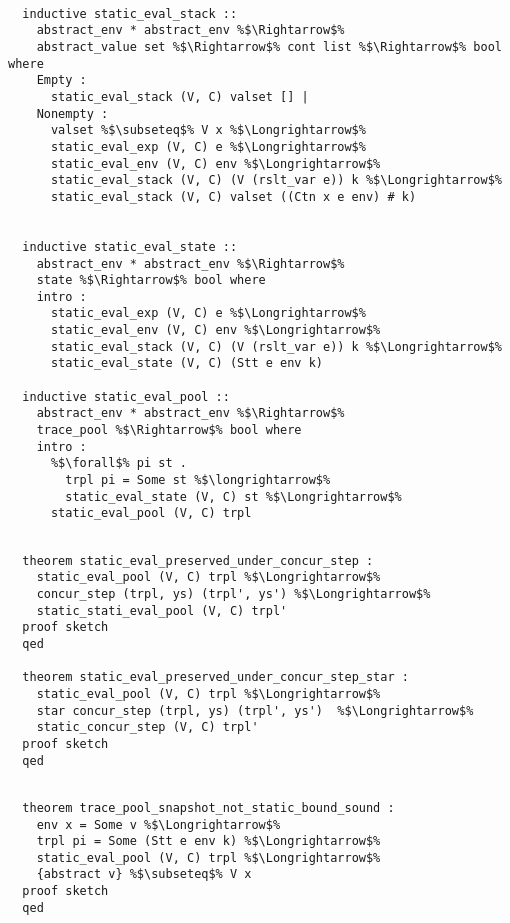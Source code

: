 \documentclass{article}
\begin{document}
\begin{lstlisting}[style=codestyle1, escapechar=\%]

  inductive static_eval_stack ::
    abstract_env * abstract_env %$\Rightarrow$%
    abstract_value set %$\Rightarrow$% cont list %$\Rightarrow$% bool where
    Empty :
      static_eval_stack (V, C) valset [] |
    Nonempty : 
      valset %$\subseteq$% V x %$\Longrightarrow$%
      static_eval_exp (V, C) e %$\Longrightarrow$%
      static_eval_env (V, C) env %$\Longrightarrow$%
      static_eval_stack (V, C) (V (rslt_var e)) k %$\Longrightarrow$%
      static_eval_stack (V, C) valset ((Ctn x e env) # k)


  inductive static_eval_state ::
    abstract_env * abstract_env %$\Rightarrow$%
    state %$\Rightarrow$% bool where
    intro :
      static_eval_exp (V, C) e %$\Longrightarrow$%
      static_eval_env (V, C) env %$\Longrightarrow$%
      static_eval_stack (V, C) (V (rslt_var e)) k %$\Longrightarrow$%
      static_eval_state (V, C) (Stt e env k)

  inductive static_eval_pool ::
    abstract_env * abstract_env %$\Rightarrow$%
    trace_pool %$\Rightarrow$% bool where
    intro :
      %$\forall$% pi st .
        trpl pi = Some st %$\longrightarrow$%
        static_eval_state (V, C) st %$\Longrightarrow$% 
      static_eval_pool (V, C) trpl

  \end{lstlisting}

\begin{lstlisting}[style=codestyle1, escapechar=\%]

  theorem static_eval_preserved_under_concur_step :
    static_eval_pool (V, C) trpl %$\Longrightarrow$% 
    concur_step (trpl, ys) (trpl', ys') %$\Longrightarrow$%
    static_stati_eval_pool (V, C) trpl'
  proof sketch
  qed

  theorem static_eval_preserved_under_concur_step_star :
    static_eval_pool (V, C) trpl %$\Longrightarrow$% 
    star concur_step (trpl, ys) (trpl', ys')  %$\Longrightarrow$% 
    static_concur_step (V, C) trpl'
  proof sketch
  qed
  \end{lstlisting}

\begin{lstlisting}[style=codestyle1, escapechar=\%]

  theorem trace_pool_snapshot_not_static_bound_sound :
    env x = Some v %$\Longrightarrow$%
    trpl pi = Some (Stt e env k) %$\Longrightarrow$%
    static_eval_pool (V, C) trpl %$\Longrightarrow$%
    {abstract v} %$\subseteq$% V x
  proof sketch
  qed
  \end{lstlisting}
\end{document}
